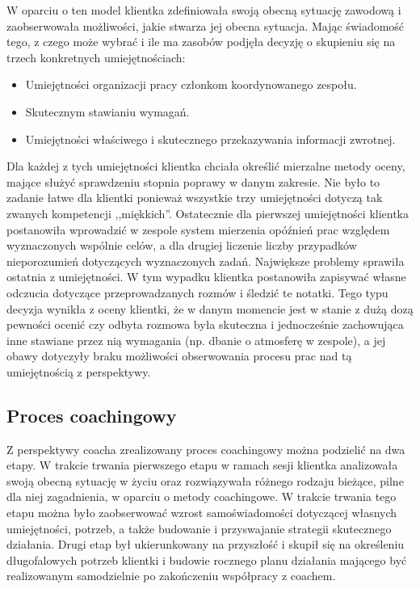 W oparciu o ten model klientka zdefiniowała swoją obecną sytuację zawodową i zaobserwowała możliwości, jakie stwarza jej obecna sytuacja. Mając świadomość
tego, z czego może wybrać i ile ma zasobów podjęła decyzję o skupieniu się na trzech konkretnych umiejętnościach:
\begin{itemize}
  \item Umiejętności organizacji pracy członkom koordynowanego zespołu.
  \item Skutecznym stawianiu wymagań.
  \item Umiejętności właściwego i skutecznego przekazywania informacji zwrotnej.
\end{itemize}

Dla każdej z tych umiejętności klientka chciała określić mierzalne metody oceny, mające służyć sprawdzeniu stopnia poprawy w danym zakresie. Nie było
to zadanie łatwe dla klientki ponieważ wszystkie trzy umiejętności dotyczą tak zwanych kompetencji ,,miękkich''. Ostatecznie dla pierwszej umiejętności
klientka postanowiła wprowadzić w zespole system mierzenia opóźnień prac względem wyznaczonych wspólnie celów, a dla drugiej liczenie liczby przypadków
nieporozumień dotyczących wyznaczonych zadań. Największe problemy sprawiła ostatnia z umiejętności. W tym wypadku klientka postanowiła zapisywać własne
odczucia dotyczące przeprowadzanych rozmów i śledzić te notatki. Tego typu decyzja wynikła z oceny klientki, że w danym momencie jest w stanie z dużą
dozą pewności ocenić czy odbyta rozmowa była skuteczna i jednocześnie zachowująca inne stawiane przez nią wymagania (np. dbanie o atmosferę w zespole),
a jej obawy dotyczyły braku możliwości obserwowania procesu prac nad tą umiejętnością z perspektywy.

\subsection{Proces coachingowy}

Z perspektywy coacha zrealizowany proces coachingowy można podzielić na dwa etapy. W trakcie trwania pierwszego etapu w ramach sesji klientka
analizowała swoją obecną sytuację w życiu oraz rozwiązywała różnego rodzaju bieżące, pilne dla niej zagadnienia, w oparciu o metody coachingowe.
W trakcie trwania tego etapu można było zaobserwować wzrost samoświadomości dotyczącej własnych umiejętności, potrzeb, a także budowanie i przyswajanie
strategii skutecznego działania. Drugi etap był ukierunkowany na przyszłość i skupił się na określeniu długofalowych potrzeb klientki i budowie rocznego
planu działania mającego być realizowanym samodzielnie po zakończeniu współpracy z coachem.


